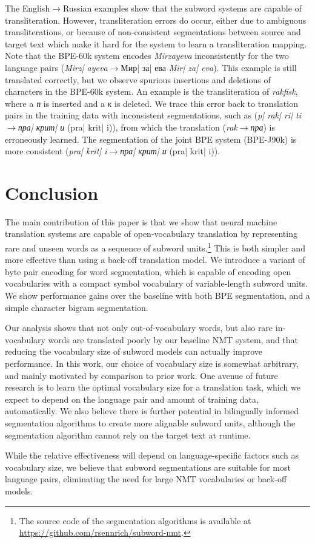 The English$\to$Russian examples show that the subword systems are capable of transliteration. However, transliteration errors do occur, either due to ambiguous transliterations, or because of non-consistent segmentations between source and target text which make it hard for the system to learn a transliteration mapping. Note that the BPE-60k system encodes \emph{Mirzayeva} inconsistently for the two language pairs (\emph{Mirz{\color{gray}|} ayeva}$\rightarrow$\foreignlanguage{russian}{Мир{\color{gray}|} за{\color{gray}|} ева} \emph{Mir{\color{gray}|} za{\color{gray}|} eva}). This example is still translated correctly, but we observe spurious insertions and deletions of characters in the BPE-60k system. An example is the transliteration of \emph{rakfisk}, where a \emph{\foreignlanguage{russian}{п}} is inserted and a \emph{\foreignlanguage{russian}{к}} is deleted. We trace this error back to translation pairs in the training data with inconsistent segmentations, such as (\emph{p{\color{gray}|} rak{\color{gray}|} ri{\color{gray}|} ti}$\rightarrow$\emph{\foreignlanguage{russian}{пра{\color{gray}|} крит{\color{gray}|} и}} (pra{\color{gray}|} krit{\color{gray}|} i)), from which the translation (\emph{rak}$\rightarrow$\emph{\foreignlanguage{russian}{пра}}) is erroneously learned. The segmentation of the joint BPE system (BPE-J90k) is more consistent (\emph{pra{\color{gray}|} krit{\color{gray}|} i}$\rightarrow$\emph{\foreignlanguage{russian}{пра{\color{gray}|} крит{\color{gray}|} и}} (pra{\color{gray}|} krit{\color{gray}|} i)).

\section{Conclusion}

The main contribution of this paper is that we show that neural machine translation systems are capable of open-vocabulary translation by representing rare and unseen words as a sequence of subword units.\footnote{The source code of the segmentation algorithms is available at \url{https://github.com/rsennrich/subword-nmt}.}
This is both simpler and more effective than using a back-off translation model. We introduce a variant of byte pair encoding for word segmentation, which is capable of encoding open vocabularies with a compact symbol vocabulary of variable-length subword units. We show performance gains over the baseline with both BPE segmentation, and a simple character bigram segmentation.

Our analysis shows that not only out-of-vocabulary words, but also rare in-vocabulary words are translated poorly by our baseline NMT system, and that reducing the vocabulary size of subword models can actually improve performance. In this work, our choice of vocabulary size is somewhat arbitrary, and mainly motivated by comparison to prior work. One avenue of future research is to learn the optimal vocabulary size for a translation task, which we expect to depend on the language pair and amount of training data, automatically. We also believe there is further potential in bilingually informed segmentation algorithms to create more alignable subword units, although the segmentation algorithm cannot rely on the target text at runtime.

While the relative effectiveness will depend on language-specific factors such as vocabulary size, we believe that subword segmentations are suitable for most language pairs, eliminating the need for large NMT vocabularies or back-off models.


